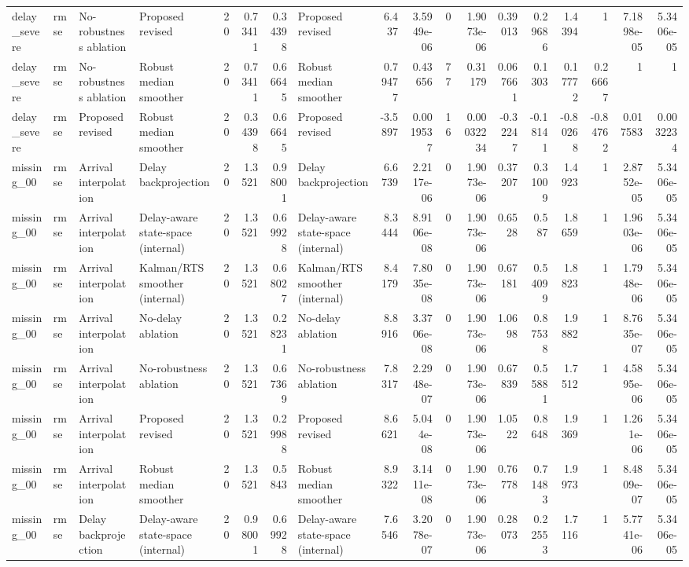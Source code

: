 \begin{table}[!htbp]
{\begin{tabular}{llllrrrlrrrrrrrrrr}
delay_severe & rmse & No-robustness ablation & Proposed revised & 20 & 0.73411 & 0.34398 & Proposed revised & 6.437 & 3.5949e-06 & 0 & 1.9073e-06 & 0.39013 & 0.29686 & 1.4394 & 1 & 7.1898e-05 & 5.3406e-05 \\
delay_severe & rmse & No-robustness ablation & Robust median smoother & 20 & 0.73411 & 0.66645 & Robust median smoother & 0.79477 & 0.43656 & 77 & 0.31179 & 0.067661 & 0.1303 & 0.17772 & 0.26667 & 1 & 1 \\
delay_severe & rmse & Proposed revised & Robust median smoother & 20 & 0.34398 & 0.66645 & Proposed revised & -3.5897 & 0.0019537 & 16 & 0.00032234 & -0.32247 & -0.18141 & -0.80268 & -0.84762 & 0.017583 & 0.0032234 \\
missing_00 & rmse & Arrival interpolation & Delay backprojection & 20 & 1.3521 & 0.98001 & Delay backprojection & 6.6739 & 2.2117e-06 & 0 & 1.9073e-06 & 0.37207 & 0.31009 & 1.4923 & 1 & 2.8752e-05 & 5.3406e-05 \\
missing_00 & rmse & Arrival interpolation & Delay-aware state-space (internal) & 20 & 1.3521 & 0.69928 & Delay-aware state-space (internal) & 8.3444 & 8.9106e-08 & 0 & 1.9073e-06 & 0.6528 & 0.587 & 1.8659 & 1 & 1.9603e-06 & 5.3406e-05 \\
missing_00 & rmse & Arrival interpolation & Kalman/RTS smoother (internal) & 20 & 1.3521 & 0.68027 & Kalman/RTS smoother (internal) & 8.4179 & 7.8035e-08 & 0 & 1.9073e-06 & 0.67181 & 0.54099 & 1.8823 & 1 & 1.7948e-06 & 5.3406e-05 \\
missing_00 & rmse & Arrival interpolation & No-delay ablation & 20 & 1.3521 & 0.28231 & No-delay ablation & 8.8916 & 3.3706e-08 & 0 & 1.9073e-06 & 1.0698 & 0.87538 & 1.9882 & 1 & 8.7635e-07 & 5.3406e-05 \\
missing_00 & rmse & Arrival interpolation & No-robustness ablation & 20 & 1.3521 & 0.67369 & No-robustness ablation & 7.8317 & 2.2948e-07 & 0 & 1.9073e-06 & 0.67839 & 0.55881 & 1.7512 & 1 & 4.5895e-06 & 5.3406e-05 \\
missing_00 & rmse & Arrival interpolation & Proposed revised & 20 & 1.3521 & 0.29988 & Proposed revised & 8.6621 & 5.044e-08 & 0 & 1.9073e-06 & 1.0522 & 0.8648 & 1.9369 & 1 & 1.261e-06 & 5.3406e-05 \\
missing_00 & rmse & Arrival interpolation & Robust median smoother & 20 & 1.3521 & 0.5843 & Robust median smoother & 8.9322 & 3.1411e-08 & 0 & 1.9073e-06 & 0.76778 & 0.71483 & 1.9973 & 1 & 8.4809e-07 & 5.3406e-05 \\
missing_00 & rmse & Delay backprojection & Delay-aware state-space (internal) & 20 & 0.98001 & 0.69928 & Delay-aware state-space (internal) & 7.6546 & 3.2078e-07 & 0 & 1.9073e-06 & 0.28073 & 0.22553 & 1.7116 & 1 & 5.7741e-06 & 5.3406e-05 \\

\end{tabular}}
\end{table}
